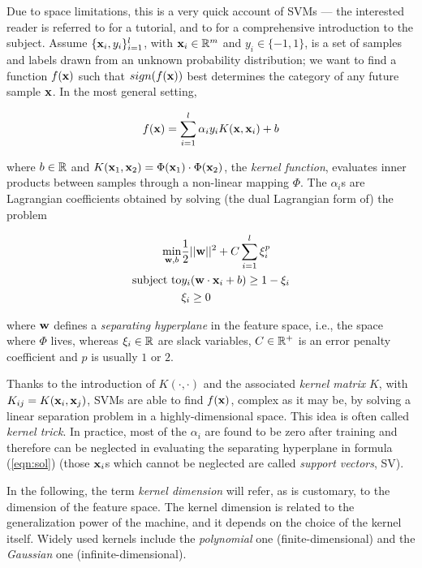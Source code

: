 Due to space limitations, this is a very quick account of SVMs --- the
interested reader is referred to \cite{Burges98} for a tutorial, and
to \cite{Cristianini00} for a comprehensive introduction to the
subject. Assume $\{\mathbf{x}_i,y_i\}_{i=1}^l$, with $\mathbf{x}_i \in \mathbb{R}^m$ and
$y_i \in \{-1,1\}$, is a set of samples and labels drawn from an
unknown probability distribution; we want to find a function $f(\mathbf{x})$
such that $sign(f(\mathbf{x}))$ best determines the category of any future
sample $\mathbf{x}$. In the most general setting,

\begin{equation} \label{eqn:sol}
  f(\mathbf{x}) = \sum_{i=1}^l \alpha_i y_i K(\mathbf{x},\mathbf{x}_i) + b
\end{equation}

\noindent where $b \in \mathbb{R}$ and $K(\mathbf{x}_1,\mathbf{x}_2) = \Phi(\mathbf{x}_1)
\cdot \Phi(\mathbf{x}_2)$, the \emph{kernel function}, evaluates inner
products between samples through a non-linear mapping $\Phi$. The
$\alpha_i$s are Lagrangian coefficients obtained by solving (the dual
Lagrangian form of) the problem

\begin{eqnarray} \label{eqn:svm_primal}
  \min_{\mathbf{w},b}      & \frac{1}{2} ||\mathbf{w}||^2 + C \sum_{i=1}^l \xi_i^p \\
  \mbox{subject to} & y_i (\mathbf{w}\cdot\mathbf{x}_i + b) \geq 1-\xi_i            \nonumber \\
                    & \xi_i \geq 0                                    \nonumber
\end{eqnarray}

\noindent where $\mathbf{w}$ defines a \emph{separating hyperplane}
in the feature space, i.e., the space where $\Phi$ lives, whereas
$\xi_i \in \mathbb{R}$ are slack variables, $C \in \mathbb{R}^+$ is an error penalty
coefficient and $p$ is usually $1$ or $2$.

Thanks to the introduction of $K(\cdot,\cdot)$ and the associated
\emph{kernel matrix} $K$, with $K_{ij} = K(\mathbf{x}_i,\mathbf{x}_j)$, SVMs are
able to find $f(\mathbf{x})$, complex as it may be, by solving a linear
separation problem in a highly-dimensional space. This idea is often
called \emph{kernel trick}. In practice, most of the $\alpha_i$ are
found to be zero after training and therefore can be neglected in
evaluating the separating hyperplane in formula (\ref{eqn:sol}) (those
$\mathbf{x}_i$s which cannot be neglected are called \emph{support vectors},
SV).

In the following, the term \emph{kernel dimension} will refer, as is
customary, to the dimension of the feature space. The kernel dimension
is related to the generalization power of the machine, and it depends
on the choice of the kernel itself. Widely used kernels include the
\emph{polynomial} one (finite-dimensional) and the \emph{Gaussian} one
(infinite-dimensional).
